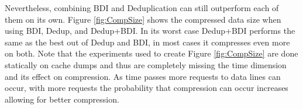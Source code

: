 Nevertheless, combining BDI and Deduplication can still outperform each of them on its own. Figure \ref{fig:CompSize} shows the compressed data size when using BDI, Dedup, and Dedup+BDI. In its worst case Dedup+BDI performs the same as the best out of Dedup and BDI, in most cases it compresses even more on both. Note that the experiments used to create Figure \ref{fig:CompSize} are done statically on cache dumps and thus are completely missing the time dimension and its effect on compression. As time passes more requests to data lines can occur, with more requests the probability that compression can occur increases allowing for better compression.
